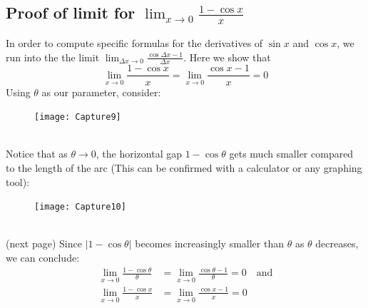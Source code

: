 \documentclass{report}
\begin{document}
\subsection{Proof of limit for $\lim_{x\to 0}\frac{1-\cos x}{x}$}%
In order to compute specific formulas for the derivatives of $\sin x$ and $\cos x$, we run into 
the the limit $\lim_{\Delta x\to 0}\frac{\cos\Delta x-1}{\Delta x}$. Here we show that
\begin{equation*}
\lim_{x\to 0}\frac{1-\cos x}{x}=\lim_{x\to 0}\frac{\cos x-1}{x}=0
\end{equation*}
Using $\theta$ as our parameter, consider:
\begin{figure}[h]
\texttt{[image: Capture9]}
\centering
{}
\end{figure}\\ 
Notice that as $\theta\to 0$, the horizontal gap $1-\cos\theta$ gets much smaller compared to
the length of the arc (This can be confirmed with a calculator or any graphing tool):
\begin{figure}[h]
\texttt{[image: Capture10]}
\centering
{}
\end{figure}\\ 
(next page)
\newpage    
\noindent Since $|1-\cos\theta|$ becomes increasingly smaller than 
$\theta$ as $\theta$ decreases, we can conclude:
\begin{align*}
\lim_{x\to 0}\frac{1-\cos\theta}{\theta}&=\lim_{x\to 0}\frac{\cos\theta-1}{\theta}
=0\quad\text{and}\\
\lim_{x\to 0}\frac{1-\cos x}{x}&=\lim_{x\to 0}\frac{\cos x-1}{x}=0
\end{align*}

\newpage
\end{document}
